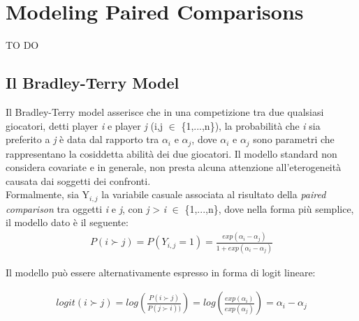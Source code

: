 \chapter{Modeling Paired Comparisons}

TO DO

\section{Il Bradley-Terry Model}
Il Bradley-Terry model \autocite{bradley1952rank} asserisce che in una competizione tra due qualsiasi giocatori, detti player \textit{i} e player \textit{j} (i,j $\in$ \{1,...,n\}), la probabilità che \textit{i} sia preferito a \textit{j} è data dal rapporto tra $\alpha_{i}$ e $\alpha_{j}$, dove $\alpha_{i}$ e $\alpha_{j}$ sono parametri che rappresentano la cosiddetta abilità dei due giocatori. Il modello standard non considera covariate e in generale, non presta alcuna attenzione all'eterogeneità causata dai soggetti dei confronti.\\

Formalmente, sia Y$_{i,j}$ la variabile casuale associata al risultato della \emph{paired comparison} tra oggetti \textit{i} e \textit{j}, con \textit{j} > \textit{i} $\in$ \{1,...,n\}, dove nella forma più semplice, il modello dato è il seguente:
\begin{align} 
	P(i\succ j) = P(Y_{i,j} = 1) = \frac{exp(\alpha_{i} - \alpha_{j})}{1 + exp(\alpha_{i} - \alpha_{j})} \label{for:3.1} 
\end{align}

Il modello può essere alternativamente espresso in forma di logit lineare:

\begin{align}
		logit(i \succ j) =  log( \frac{P( i \succ j)}{P( j \succ i))} ) = log(\frac{exp(\alpha_{i})}{exp(\alpha_{j})}) = \alpha_i - \alpha_j 
	\end{align}

